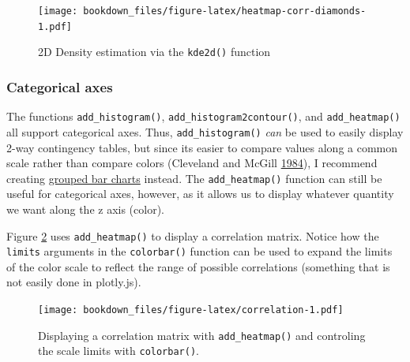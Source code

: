 \documentclass[12pt,]{isuthesis}
\newenvironment{Shaded}{\begin{snugshade}}{\end{snugshade}}
\newcommand{\KeywordTok}[1]{\textcolor[rgb]{0.13,0.29,0.53}{\textbf{{#1}}}}
\newcommand{\DataTypeTok}[1]{\textcolor[rgb]{0.13,0.29,0.53}{{#1}}}
\newcommand{\DecValTok}[1]{\textcolor[rgb]{0.00,0.00,0.81}{{#1}}}
\newcommand{\StringTok}[1]{\textcolor[rgb]{0.31,0.60,0.02}{{#1}}}
\newcommand{\NormalTok}[1]{{#1}}
\begin{document}
\begin{figure}[htbp]
\centering
\texttt{[image: bookdown\_files/figure-latex/heatmap-corr-diamonds-1.pdf]}
\caption{\label{fig:heatmap-corr-diamonds}2D Density estimation via the
\texttt{kde2d()} function}
\end{figure}

\subsubsection{Categorical axes}\label{categorical-axes}

The functions \texttt{add\_histogram()},
\texttt{add\_histogram2contour()}, and \texttt{add\_heatmap()} all
support categorical axes. Thus, \texttt{add\_histogram()} \emph{can} be
used to easily display 2-way contingency tables, but since its easier to
compare values along a common scale rather than compare colors
(Cleveland and McGill
\protect\hyperlink{ref-graphical-perception}{1984}), I recommend
creating \protect\hyperlink{multiple-discrete-distributions}{grouped bar
charts} instead. The \texttt{add\_heatmap()} function can still be
useful for categorical axes, however, as it allows us to display
whatever quantity we want along the z axis (color).

Figure \ref{fig:correlation} uses \texttt{add\_heatmap()} to display a
correlation matrix. Notice how the \texttt{limits} arguments in the
\texttt{colorbar()} function can be used to expand the limits of the
color scale to reflect the range of possible correlations (something
that is not easily done in plotly.js).

\begin{Shaded}
\end{Shaded}

\begin{figure}[htbp]
\centering
\texttt{[image: bookdown\_files/figure-latex/correlation-1.pdf]}
\caption{\label{fig:correlation}Displaying a correlation matrix with
\texttt{add\_heatmap()} and controling the scale limits with
\texttt{colorbar()}.}
\end{figure}
\end{document}
